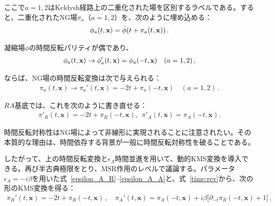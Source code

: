 ここで$a=1,2$はKeldysh経路上の二重化された場を区別するラベルである。すると、二重化されたNG場$\pi_a$（$a=1,2$）を、次のように埋め込める：
\begin{align}
\phi_a(t,{\bf x})=\bar\phi(t+\pi_a(t,\mathbf x))\,.
\end{align}

凝縮場$\phi$の時間反転パリティが偶であり、
\begin{align}
\phi_a(t,{\bf x})\to\phi_a'(t,{\bf x})=\phi_a(-t,{\bf x})
\quad
(a=1,2)\,,
\label{ota}
\end{align}

ならば、NG場の時間反転変換は次で与えられる：
\begin{align}
\pi_a(t,\mathbf x)\to \pi_a'(t,\mathbf x) = -2t+\pi_a(-t,\mathbf x)\quad
(a=1,2)\,.
\end{align}

$RA$基底では、これを次のように書き直せる：
\begin{align}
    \pi'_R(t,\mathbf x)=-2t+\pi_R(-t,\mathbf x),~~
        \pi'_A(t,\mathbf x)=\pi_A(-t,\mathbf x).
        \label{time:rev}
\end{align}

時間反転対称性はNG場によって非線形に実現されることに注意されたい。その本質的な理由は、時間依存する背景が一般に時間反転対称性を破ることである。

\medskip
したがって、上の時間反転変換と$\epsilon_A$時間並進を用いて、動的KMS変換を導入できる。再び半古典極限をとり、MSR作用のレベルで議論する。パラメータ$\epsilon_A=-i\beta$を用いた式~\eqref{epsilon_A_R}--\eqref{epsilon_A_A}と、式~\eqref{time:rev}から、次の形のKMS変換を得る：
\begin{align}
\label{KMS}
 \pi_R'(t,\mathbf x) =-2t+\pi_R(-t,\mathbf x)
 \,,
 \quad
 \pi_A'(t,\mathbf x) = 
 \pi_A(-t,\mathbf x) 
 + i\beta \big[\partial_{-t} \pi_R(-t,\mathbf x)+1\big]\,,
\end{align}

